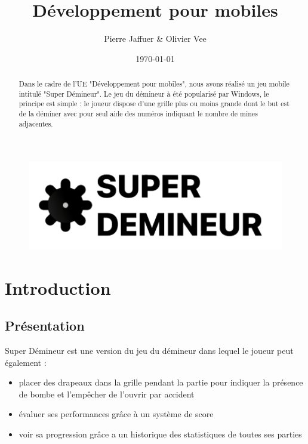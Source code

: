 \documentclass{article}
\title{Développement pour mobiles}
\author{Pierre Jaffuer \& Olivier Vee}
\date{\today}
\begin{document}
\maketitle %
\begin{figure}[H]
    \centering
    \includegraphics[width=0.75\linewidth]{AppsLogo.png}
\end{figure}

\begin{abstract}
Dans le cadre de l'UE "Développement pour mobiles", nous avons réalisé un jeu mobile intitulé "Super Démineur". 
Le jeu du démineur à été popularisé par Windows, le principe est simple : le joueur dispose d'une grille plus ou moins grande dont le but est de la déminer avec pour seul aide des numéros indiquant le nombre de mines adjacentes.
\end{abstract}

\newpage
\tableofcontents 
\newpage



\section{Introduction}
\subsection{Présentation}

Super Démineur est une version du jeu du démineur dans lequel le joueur peut également :
\begin{itemize}
    \item placer des drapeaux dans la grille pendant la partie pour indiquer la présence de bombe et l'empêcher de l'ouvrir par accident
    \item évaluer ses performances grâce à un système de score 
    \item voir sa progression grâce a un historique des statistiques de toutes ses parties
\end{itemize}
\end{document}
